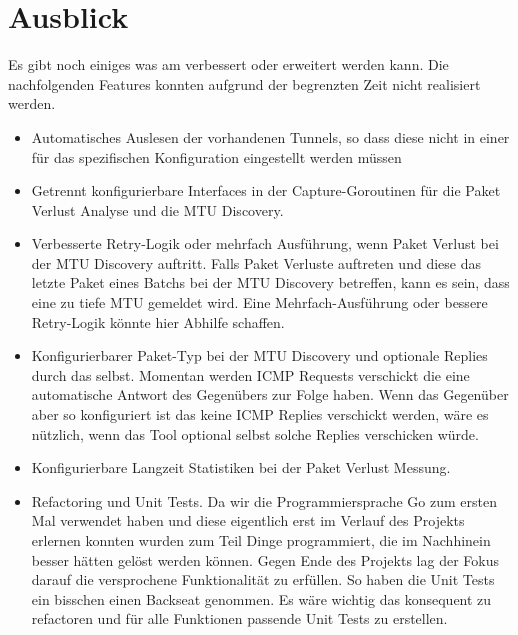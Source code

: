 \chapter{Ausblick}
\label{chap:Ausblick}

Es gibt noch einiges was am \tool{} verbessert oder erweitert werden kann. Die nachfolgenden Features konnten aufgrund der begrenzten Zeit nicht realisiert werden.

\begin{itemize}
\item Automatisches Auslesen der vorhandenen Tunnels, so dass diese nicht in einer für das \tool{} spezifischen Konfiguration eingestellt werden müssen

\item Getrennt konfigurierbare Interfaces in der Capture-Goroutinen für die Paket Verlust Analyse und die MTU Discovery.

\item Verbesserte Retry-Logik oder mehrfach Ausführung, wenn Paket Verlust bei der MTU Discovery auftritt. Falls Paket Verluste auftreten und diese das letzte Paket eines Batchs bei der MTU Discovery betreffen, kann es sein, dass eine zu tiefe MTU gemeldet wird. Eine Mehrfach-Ausführung oder bessere Retry-Logik könnte hier Abhilfe schaffen.

\item Konfigurierbarer Paket-Typ bei der MTU Discovery und optionale Replies durch das \tool{} selbst. Momentan werden ICMP Requests verschickt die eine automatische Antwort des Gegenübers zur Folge haben. Wenn das Gegenüber aber so konfiguriert ist das keine ICMP Replies verschickt werden, wäre es nützlich, wenn das Tool optional selbst solche Replies verschicken würde.

\item Konfigurierbare Langzeit Statistiken bei der Paket Verlust Messung.

\item Refactoring und Unit Tests. Da wir die Programmiersprache Go zum ersten Mal verwendet haben und diese eigentlich erst im Verlauf des Projekts erlernen konnten wurden zum Teil Dinge programmiert, die im Nachhinein besser hätten gelöst werden können. Gegen Ende des Projekts lag der Fokus darauf die versprochene Funktionalität zu erfüllen. So haben die Unit Tests ein bisschen einen Backseat genommen. Es wäre wichtig das \tool{} konsequent zu refactoren und für alle Funktionen passende Unit Tests zu erstellen.
\end{itemize}
